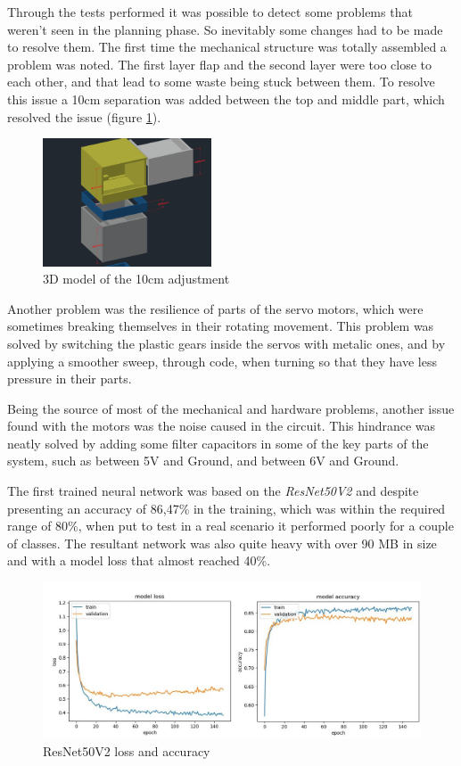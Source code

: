 \documentclass[a4paper,11pt]{article}
\begin{document}
Through the tests performed it was possible to detect some problems that weren't seen in the planning phase. So inevitably some changes had to be made to resolve them. The first time the mechanical structure was totally assembled a problem was noted. The first layer flap and the second layer were too close to each other, and that lead to some waste being stuck between them. To resolve this issue a 10cm separation was added between the top and middle part, which resolved the issue (figure \ref{fig:adjustment}).

\begin{figure}[H]
  \centering
  \includegraphics[width=5cm]{Figures/Middle part adjustment.png}
  \caption{\small{3D model of the 10cm adjustment}}
  \label{fig:adjustment}
\end{figure}

Another problem was the resilience of parts of the servo motors, which were sometimes breaking themselves in their rotating movement. This problem was solved by switching the plastic gears inside the servos with metalic ones, and by applying a smoother sweep, through code, when turning so that they have less pressure in their parts.

Being the source of most of the mechanical and hardware problems, another issue found with the motors was the noise caused in the circuit. This hindrance was neatly solved by adding some filter capacitors in some of the key parts of the system, such as between 5V and Ground, and between 6V and Ground.


The first trained neural network was based on the \textit{ResNet50V2} and despite presenting an accuracy of 86,47\% in the training, which was within the required range of 80\%, when put to test in a real scenario it performed poorly for a couple of classes. The resultant network was also quite heavy with over 90 MB in size and with a model loss that almost reached 40\%.

\begin{figure}[H]
  \centering
  \includegraphics[width=12cm]{Figures/ResNet50V2_Loss_Acc.jpg}
  \caption{\small{ResNet50V2 loss and accuracy}}
  \label{fig:resnetLossAcc}
\end{figure}
\end{document}
